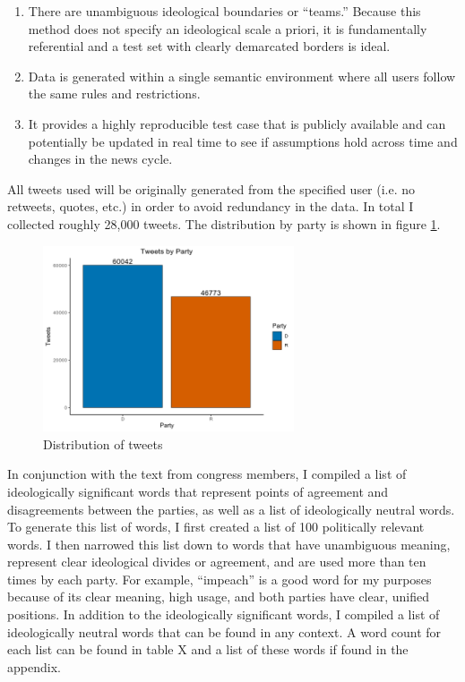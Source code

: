 \documentclass[../embeddings.tex]{subfiles}
\begin{document}
\begin{enumerate}
\item There are unambiguous ideological boundaries or “teams.” Because this method does not specify an ideological scale a priori, it is fundamentally referential and a test set with clearly demarcated borders is ideal.
\item Data is generated within a single semantic environment where all users follow the same rules and restrictions.
\item It provides a highly reproducible test case that is publicly available and can potentially be updated in real time to see if assumptions hold across time and changes in the news cycle.
\end{enumerate}
All tweets used will be originally generated from the specified user (i.e. no retweets, quotes, etc.) in order to avoid redundancy in the data. In total I collected roughly 28,000 tweets. The distribution by party is shown in figure \ref{fig:tweets}.



\begin{figure}[t]
\includegraphics[width=0.66\textwidth]{tweetcount}
\caption{Distribution of tweets}
\label{fig:tweets}
\end{figure}


In conjunction with the text from congress members, I compiled a list of ideologically significant words that represent points of agreement and disagreements between the parties, as well as a list of ideologically neutral words. To generate this list of words, I  first created a list of 100 politically relevant words. I then narrowed this list down to words that have unambiguous meaning, represent clear ideological divides or agreement, and are used more than ten times by each party. For example, “impeach” is a good word for my purposes because of its clear meaning, high usage, and both parties have clear, unified positions.  In addition to the ideologically significant words, I compiled a list of ideologically neutral words that can be found in any context. A word count for each list can be found in table X and a list of these words if found in the appendix.
\end{document}
